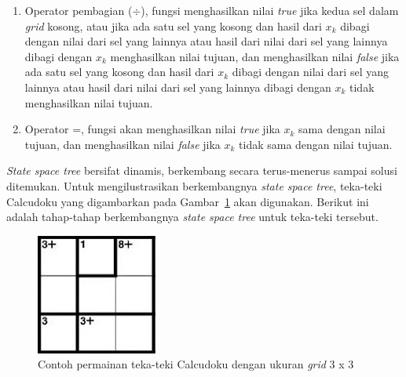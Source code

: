 \documentclass[a4paper,twoside]{article}
\begin{document}
\begin{enumerate}
\begin{enumerate}
\item Operator pembagian (\begin{math}\div\end{math}), fungsi menghasilkan nilai \textit{true} jika kedua sel dalam \textit{grid} kosong, atau jika ada satu sel yang kosong dan hasil dari \begin{math}x_k\end{math} dibagi dengan nilai dari sel yang lainnya atau hasil dari nilai dari sel yang lainnya dibagi dengan \begin{math}x_k\end{math} menghasilkan nilai tujuan, dan menghasilkan nilai \textit{false} jika ada satu sel yang kosong dan hasil dari \begin{math}x_k\end{math} dibagi dengan nilai dari sel yang lainnya atau hasil dari nilai dari sel yang lainnya dibagi dengan \begin{math}x_k\end{math} tidak menghasilkan nilai tujuan.
\item Operator =, fungsi akan menghasilkan nilai \textit{true} jika \begin{math}x_k\end{math} sama dengan nilai tujuan, dan menghasilkan nilai \textit{false} jika \begin{math}x_k\end{math} tidak sama dengan nilai tujuan.
\end{enumerate}

\textit{State space tree} bersifat dinamis, berkembang secara terus-menerus sampai solusi ditemukan. Untuk mengilustrasikan berkembangnya \textit{state space tree}, teka-teki Calcudoku yang digambarkan pada Gambar~\ref{fig:backtracking4} akan digunakan. Berikut ini adalah tahap-tahap berkembangnya \textit{state space tree} untuk teka-teki tersebut.

\begin{figure}
\centering
\captionsetup{justification=centering}
\includegraphics[scale=1]{Gambar/Backtracking4}
\caption[Contoh permainan teka-teki Calcudoku dengan ukuran \textit{grid} 3 x 3 ~\cite{Fahda}]{Contoh permainan teka-teki Calcudoku dengan ukuran \textit{grid} 3 x 3  ~\cite{Fahda}}
\label{fig:backtracking4}
\end{figure}


\end{enumerate}
\end{document}
